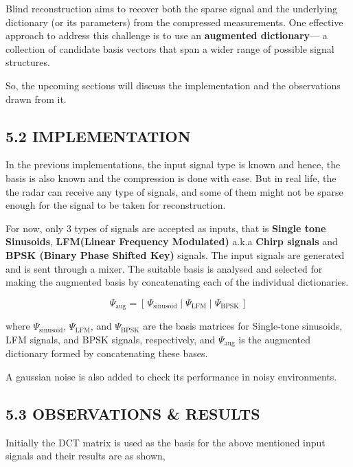 \documentclass[
  letterpaper,
  DIV=11,
  numbers=noendperiod]{scrartcl}
\begin{document}
Blind reconstruction aims to recover both the sparse signal and the
underlying dictionary (or its parameters) from the compressed
measurements. One effective approach to address this challenge is to use
an \textbf{augmented dictionary}--- a collection of candidate basis
vectors that span a wider range of possible signal structures.

So, the upcoming sections will discuss the implementation and the
observations drawn from it.

\subsection{5.2 IMPLEMENTATION}\label{implementation}

In the previous implementations, the input signal type is known and
hence, the basis is also known and the compression is done with ease.
But in real life, the the radar can receive any type of signals, and
some of them might not be sparse enough for the signal to be taken for
reconstruction.

For now, only 3 types of signals are accepted as inputs, that is
\textbf{Single tone Sinusoids}, \textbf{LFM(Linear Frequency Modulated)}
a.k.a \textbf{Chirp signals} and \textbf{BPSK (Binary Phase Shifted
Key)} signals. The input signals are generated and is sent through a
mixer. The suitable basis is analysed and selected for making the
augmented basis by concatenating each of the individual dictionaries.

\begin{equation}
\boxed{
    \Psi_{\text{aug}} = \left[\, \Psi_{\text{sinusoid}} \;\Big|\; \Psi_{\text{LFM}} \;\Big|\; \Psi_{\text{BPSK}} \,\right]
}
\end{equation}

where \(\Psi_{\text{sinusoid}}\), \(\Psi_{\text{LFM}}\), and
\(\Psi_{\text{BPSK}}\) are the basis matrices for Single-tone sinusoids,
LFM signals, and BPSK signals, respectively, and \(\Psi_{\text{aug}}\)
is the augmented dictionary formed by concatenating these bases.

A gaussian noise is also added to check its performance in noisy
environments.

\subsection{5.3 OBSERVATIONS \& RESULTS}\label{observations-results-3}

Initially the DCT matrix is used as the basis for the above mentioned
input signals and their results are as shown,
\end{document}
